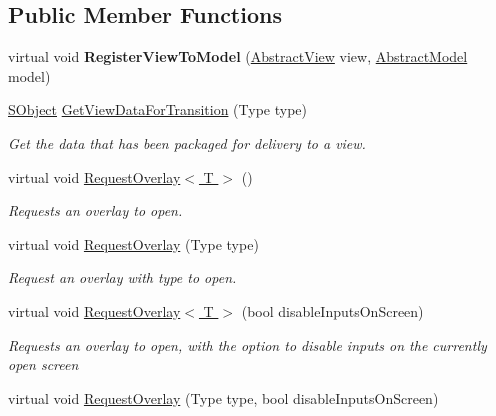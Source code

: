 \subsection*{Public Member Functions}
\begin{DoxyCompactItemize}
\item 
\hypertarget{class_scaffolding_1_1_view_request_afa476fd65d761a75a17763aa66ec4526}{virtual void {\bfseries Register\+View\+To\+Model} (\hyperlink{class_scaffolding_1_1_abstract_view}{Abstract\+View} view, \hyperlink{class_scaffolding_1_1_abstract_model}{Abstract\+Model} model)}\label{class_scaffolding_1_1_view_request_afa476fd65d761a75a17763aa66ec4526}

\item 
\hyperlink{class_scaffolding_1_1_s_object}{S\+Object} \hyperlink{class_scaffolding_1_1_view_request_a3edc966ebf54c7695dd2918007d5f433}{Get\+View\+Data\+For\+Transition} (Type type)
\begin{DoxyCompactList}\small\item\em Get the data that has been packaged for delivery to a view. \end{DoxyCompactList}\item 
virtual void \hyperlink{class_scaffolding_1_1_view_request_aa673715af6dd0fe2faa4d825d13a734d}{Request\+Overlay$<$ T $>$} ()
\begin{DoxyCompactList}\small\item\em Requests an overlay to open. \end{DoxyCompactList}\item 
virtual void \hyperlink{class_scaffolding_1_1_view_request_a73035af50a3c6e23e5de1798df478911}{Request\+Overlay} (Type type)
\begin{DoxyCompactList}\small\item\em Request an overlay with type to open. \end{DoxyCompactList}\item 
virtual void \hyperlink{class_scaffolding_1_1_view_request_a3eddf134fb24bde36070703528f48688}{Request\+Overlay$<$ T $>$} (bool disable\+Inputs\+On\+Screen)
\begin{DoxyCompactList}\small\item\em Requests an overlay to open, with the option to disable inputs on the currently open screen \end{DoxyCompactList}\item 
virtual void \hyperlink{class_scaffolding_1_1_view_request_af2db772c0e32b01dd9576bfa24ce04aa}{Request\+Overlay} (Type type, bool disable\+Inputs\+On\+Screen)

\end{DoxyCompactItemize}
